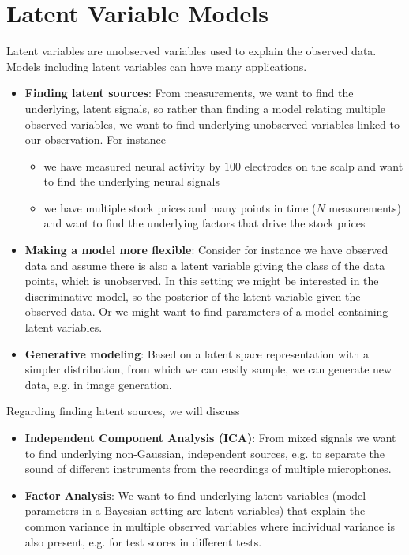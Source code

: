 \section{Latent Variable Models}
\thispagestyle{plain}

Latent variables are unobserved variables used to explain the observed data.
Models including latent variables can have many applications.

\begin{itemize}
    \item \textbf{Finding latent sources}: From measurements, we want to find the underlying, latent signals, so rather
    than finding a model relating multiple observed variables, we want to find
    underlying unobserved variables linked to our observation. For instance
    \begin{itemize}
        \item we have measured neural activity by $100$ electrodes on the scalp and want to find the underlying neural signals
        \item we have multiple stock prices and many points in time ($N$ measurements) and want to find the underlying factors that drive the stock prices
    \end{itemize}
    \item \textbf{Making a model more flexible}: Consider for instance we have observed data and 
    assume there is also a latent variable giving the class of the data points, which is unobserved.
    In this setting we might be interested in the discriminative model, so the posterior of
    the latent variable given the observed data. Or we might want to find parameters of a model
    containing latent variables.
    \item \textbf{Generative modeling}: Based on a latent space representation with a simpler distribution,
    from which we can easily sample, we can generate new data, e.g. in image generation.
\end{itemize}

Regarding finding latent sources, we will discuss

\begin{itemize}
    \item \textbf{Independent Component Analysis (ICA)}: From mixed signals we want to find underlying non-Gaussian, independent sources, e.g. 
    to separate the sound of different instruments from the recordings of multiple microphones.
    \item \textbf{Factor Analysis}: We want to find underlying latent variables (model parameters in a Bayesian setting are latent variables) that explain the common variance in multiple observed variables where
    individual variance is also present, e.g. for test scores in different tests.
\end{itemize}

